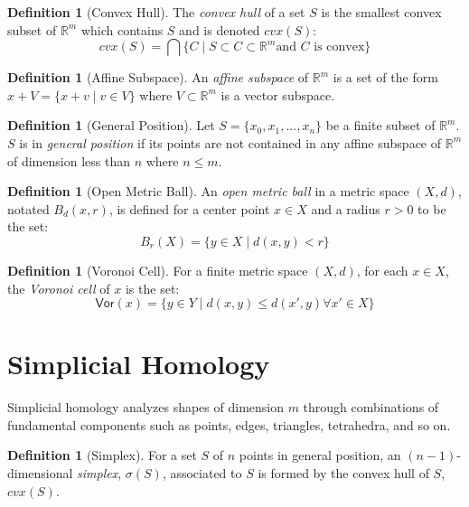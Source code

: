 \documentclass[ma]{uncgdissertationexp}
\theoremstyle{plain}
\theoremstyle{definition}
\newtheorem{definition}[theorem]{Definition}
\theoremstyle{remark}
\begin{document}
\begin{definition}[Convex Hull]
The \textit{convex hull} of a set $S$ is the smallest convex subset of $\mathbb{R}^m$ which contains $S$ and is denoted $cvx(S)$:
$$cvx(S) = \bigcap\{C \mid S\subset C \subset \mathbb{R}^m \text{and } C \text{ is convex}\}$$
\end{definition}

\begin{definition}[Affine Subspace]
An \textit{affine subspace} of $\mathbb{R}^m$ is a set of the form
$x+V = \{x + v \mid v\in V\}$ where $V\subset\mathbb{R}^m$ is a vector subspace.
\end{definition}

\begin{definition}[General Position]
Let $S=\{x_0, x_1, ..., x_n\}$ be a finite subset of $\mathbb{R}^m$. $S$ is in \textit{general position} if its points are not contained in any affine subspace of $\mathbb{R}^m$ of dimension less than $n$ where $n\leq m$.
\end{definition}

\begin{definition}[Open Metric Ball]
An \textit{open metric ball} in a metric space $(X, d)$, notated $B_{d}(x, r)$, is defined for a center point $x\in X$ and a radius $r>0$ to be the set:
$$B_{r}(X) = \{y\in X \mid d(x,y)<r\}$$
\end{definition}

\begin{definition}[Voronoi Cell]
\label{def:voronoi}
For a finite metric space $(X, d)$, for each $x\in X$, the \textit{Voronoi cell} of $x$ is the set:
$$\mathsf{Vor}(x) = \{y\in Y \mid d(x,y) \leq d(x', y) \forall x' \in X\}$$
\end{definition}

\section{Simplicial Homology}

\par Simplicial homology analyzes shapes of dimension $m$ through combinations of fundamental components such as points, edges, triangles, tetrahedra, and so on.

\begin{definition}[Simplex]
For a set $S$ of $n$ points in general position, an $(n-1)$-dimensional \textit{simplex}, $\sigma(S)$, associated to $S$ is formed by the convex hull of $S$, $cvx(S)$.
\end{definition}
\end{document}

